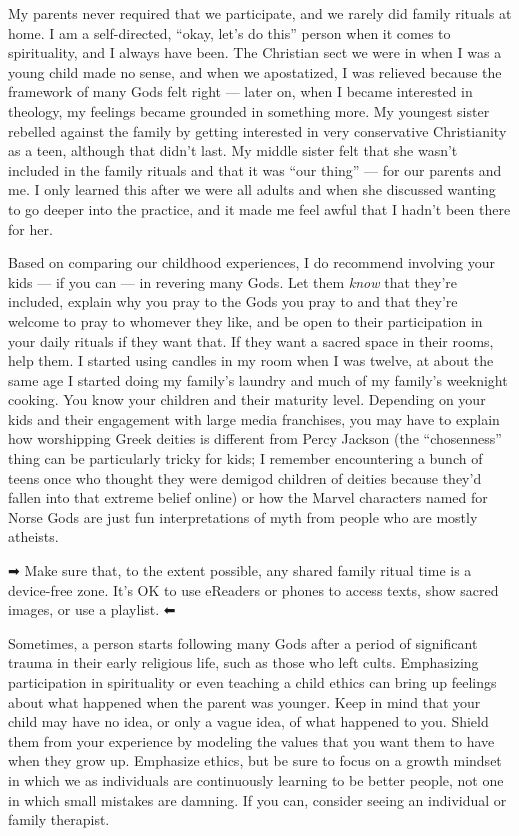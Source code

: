 \documentclass[
]{book}
\begin{document}
My parents never required that we participate, and we rarely did family rituals at home. I am a self-directed, ``okay, let's do this'' person when it comes to spirituality, and I always have been. The Christian sect we were in when I was a young child made no sense, and when we apostatized, I was relieved because the framework of many Gods felt right --- later on, when I became interested in theology, my feelings became grounded in something more. My youngest sister rebelled against the family by getting interested in very conservative Christianity as a teen, although that didn't last. My middle sister felt that she wasn't included in the family rituals and that it was ``our thing'' --- for our parents and me. I only learned this after we were all adults and when she discussed wanting to go deeper into the practice, and it made me feel awful that I hadn't been there for her.

Based on comparing our childhood experiences, I do recommend involving your kids --- if you can --- in revering many Gods. Let them \emph{know} that they're included, explain why you pray to the Gods you pray to and that they're welcome to pray to whomever they like, and be open to their participation in your daily rituals if they want that. If they want a sacred space in their rooms, help them. I started using candles in my room when I was twelve, at about the same age I started doing my family's laundry and much of my family's weeknight cooking. You know your children and their maturity level. Depending on your kids and their engagement with large media franchises, you may have to explain how worshipping Greek deities is different from Percy Jackson (the ``chosenness'' thing can be particularly tricky for kids; I remember encountering a bunch of teens once who thought they were demigod children of deities because they'd fallen into that extreme belief online) or how the Marvel characters named for Norse Gods are just fun interpretations of myth from people who are mostly atheists.

➡ Make sure that, to the extent possible, any shared family ritual time is a device-free zone. It's OK to use eReaders or phones to access texts, show sacred images, or use a playlist. ⬅

Sometimes, a person starts following many Gods after a period of significant trauma in their early religious life, such as those who left cults. Emphasizing participation in spirituality or even teaching a child ethics can bring up feelings about what happened when the parent was younger. Keep in mind that your child may have no idea, or only a vague idea, of what happened to you. Shield them from your experience by modeling the values that you want them to have when they grow up. Emphasize ethics, but be sure to focus on a growth mindset in which we as individuals are continuously learning to be better people, not one in which small mistakes are damning. If you can, consider seeing an individual or family therapist.
\end{document}
